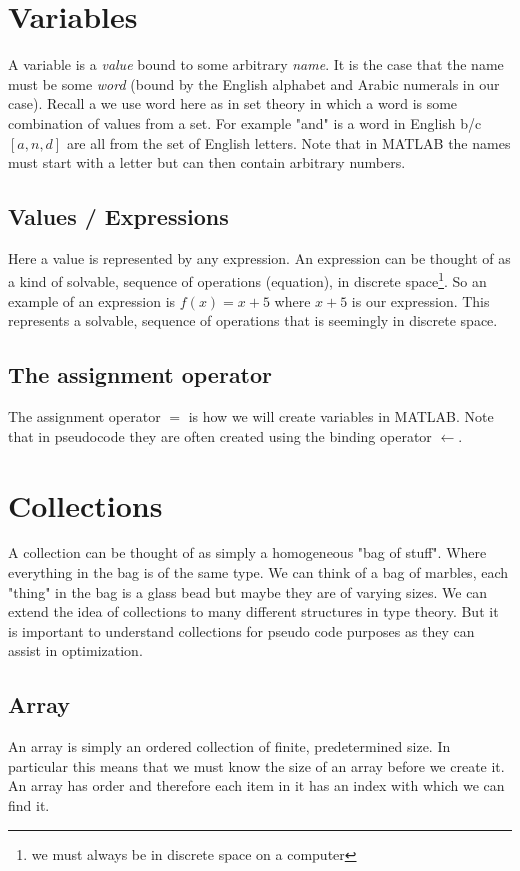 \documentclass[12pt]{article}
\begin{document}
	\section{Variables}
		A variable is a \emph{value} bound to some arbitrary \emph{name}.
		It is the case that the name must be some \emph{word} (bound by the English alphabet and Arabic numerals in our case).
		Recall a we use word here as in set theory in which a word is some combination of values from a set.
		For example "and" is a word in English b/c $[a, n, d]$ are all from the set of English letters.
		Note that in MATLAB the names must start with a letter but can then contain arbitrary numbers.
		\subsection{Values / Expressions}
			Here a value is represented by any expression.
			An expression can be thought of as a kind of solvable,
				sequence of operations (equation),
				in discrete space\footnote{we must always be in discrete space on a computer}.
			So an example of an expression is $f(x) = x+5$ where $x+5$ is our expression.
			This represents a solvable,
				sequence of operations that is seemingly in discrete space.
		\subsection{The assignment operator}
			The assignment operator $=$ is how we will create variables in MATLAB.
			Note that in pseudocode they are often created using the binding operator $\leftarrow$.
	
	\section{Collections}
		A collection can be thought of as simply a homogeneous "bag of stuff".
		Where everything in the bag is of the same type.
		We can think of a bag of marbles,
			each "thing" in the bag is a glass bead but maybe they are of varying sizes.
		We can extend the idea of collections to many different structures in type theory.
		But it is important to understand collections for pseudo code purposes as they can assist in optimization.

		\subsection{Array}
			An array is simply an ordered collection of finite, predetermined size.
			In particular this means that we must know the size of an array before we create it.
			An array has order and therefore each item in it has an index with which we can find it.
\end{document}
